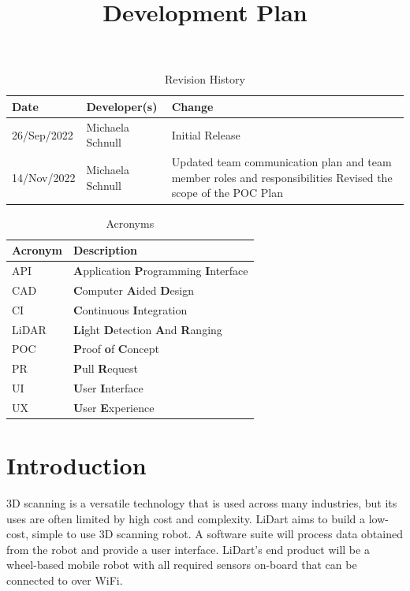 \documentclass[titlepage]{article}
\title{Development Plan\\\progname}
\author{\authname}
\date{}
\begin{document}
\maketitle

\newpage

\begin{table}[hp]
\caption{Revision History} \label{TblRevisionHistory}
\begin{tabularx}{\textwidth}{llX}
\toprule
\textbf{Date} & \textbf{Developer(s)} & \textbf{Change}\\
\midrule
26/Sep/2022 & Michaela Schnull & Initial Release\\
14/Nov/2022 & Michaela Schnull & Updated team communication plan and team member roles and responsibilities \newline Revised the scope of the POC Plan\\
\bottomrule
\end{tabularx}
\end{table}

\begin{table}[hp]
\caption{Acronyms} \label{Acronyms}
\begin{tabularx}{\textwidth}{lX}
\toprule
\textbf{Acronym} & \textbf{Description} \\
\midrule
API & \textbf{A}pplication \textbf{P}rogramming \textbf{I}nterface \\
CAD & \textbf{C}omputer \textbf{A}ided \textbf{D}esign\\
CI & \textbf{C}ontinuous \textbf{I}ntegration\\
LiDAR & \textbf{Li}ght \textbf{D}etection \textbf{A}nd \textbf{R}anging\\
POC & \textbf{P}roof \textbf{o}f \textbf{C}oncept\\
PR & \textbf{P}ull \textbf{R}equest\\
UI & \textbf{U}ser \textbf{I}nterface\\
UX & \textbf{U}ser \textbf{E}xperience\\
\bottomrule
\end{tabularx}
\end{table}

\newpage

\section{Introduction}

3D scanning is a versatile technology that is used across many industries, but its uses are often limited by high cost and complexity. LiDart aims to build a low-cost, simple to use 3D scanning robot. A software suite will process data obtained from the robot and provide a user interface. LiDart's end product will be a wheel-based mobile robot with all required sensors on-board that can be connected to over WiFi.
\end{document}
